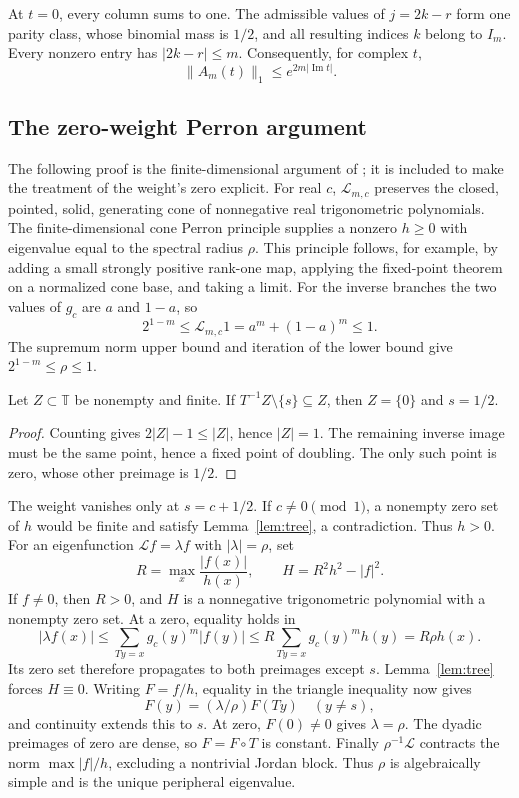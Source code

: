 \documentclass[11pt,a4paper]{article}
\theoremstyle{remark}\newtheorem*{ednote}{Editorial note (ProveIt, 2026-10-01)}
\newcommand{\T}{\mathbb T}\newcommand{\C}{\mathbb C}
\newcommand{\Lop}{\mathcal L}
\begin{document}
At $t=0$, every column sums to one. The admissible values of $j=2k-r$ form one parity class, whose binomial mass is $1/2$, and all resulting indices $k$ belong to $I_m$.
Every nonzero entry has $|2k-r|\le m$. Consequently, for complex $t$,
\begin{equation}\label{eq:growth}
 \|A_m(t)\|_1\le e^{2m|\operatorname{Im}t|}.
\end{equation}

\subsection{The zero-weight Perron argument}
The following proof is the finite-dimensional argument of \cite[Sections 5--7]{Repo}; it is included to make the treatment of the weight's zero explicit.
For real $c$, $\Lop_{m,c}$ preserves the closed, pointed, solid, generating cone of nonnegative real trigonometric polynomials.
The finite-dimensional cone Perron principle supplies a nonzero $h\ge0$ with eigenvalue equal to the spectral radius $\rho$.
This principle follows, for example, by adding a small strongly positive rank-one map, applying the fixed-point theorem on a normalized cone base, and taking a limit.
For the inverse branches the two values of $g_c$ are $a$ and $1-a$, so
\[
 2^{1-m}\le \Lop_{m,c}1=a^m+(1-a)^m\le1.
\]
The supremum norm upper bound and iteration of the lower bound give
$2^{1-m}\le\rho\le1$.

\begin{lemma}\label{lem:tree}
Let $Z\subset\T$ be nonempty and finite. If
$T^{-1}Z\setminus\{s\}\subseteq Z$, then $Z=\{0\}$ and $s=1/2$.
\end{lemma}
\begin{proof}
Counting gives $2|Z|-1\le|Z|$, hence $|Z|=1$.
The remaining inverse image must be the same point, hence a fixed point of doubling.
The only such point is zero, whose other preimage is $1/2$.
\end{proof}

The weight vanishes only at $s=c+1/2$.
If $c\ne0\pmod1$, a nonempty zero set of $h$ would be finite and satisfy Lemma~\ref{lem:tree}, a contradiction. Thus $h>0$.
For an eigenfunction $\Lop f=\lambda f$ with $|\lambda|=\rho$, set
\[
 R=\max_x\frac{|f(x)|}{h(x)},\qquad H=R^2h^2-|f|^2.
\]
If $f\ne0$, then $R>0$, and $H$ is a nonnegative trigonometric polynomial with a nonempty zero set.
At a zero, equality holds in
\[
 |\lambda f(x)|
 \le\sum_{Ty=x}g_c(y)^m|f(y)|
 \le R\sum_{Ty=x}g_c(y)^m h(y)=R\rho h(x).
\]
Its zero set therefore propagates to both preimages except $s$.
Lemma~\ref{lem:tree} forces $H\equiv0$.
Writing $F=f/h$, equality in the triangle inequality now gives
\[
 F(y)=(\lambda/\rho)F(Ty)\quad(y\ne s),
\]
and continuity extends this to $s$.
At zero, $F(0)\ne0$ gives $\lambda=\rho$.
The dyadic preimages of zero are dense, so $F=F\circ T$ is constant.
Finally $\rho^{-1}\Lop$ contracts the norm $\max|f|/h$, excluding a nontrivial Jordan block.
Thus $\rho$ is algebraically simple and is the unique peripheral eigenvalue.
\end{document}
